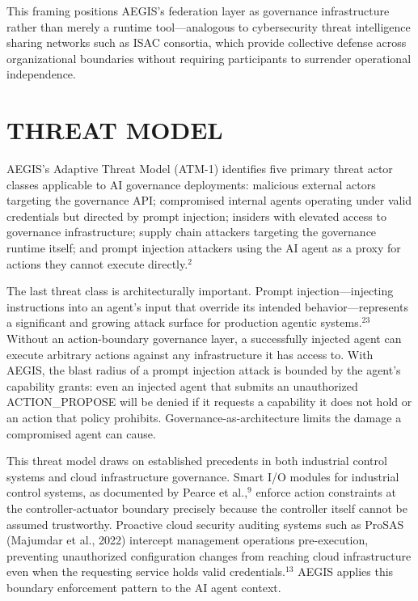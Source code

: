 \documentclass{IEEEcsmag}
\begin{document}
This framing positions AEGIS's federation layer as governance infrastructure rather than merely a runtime tool---analogous to cybersecurity threat intelligence sharing networks such as ISAC consortia, which provide collective defense across organizational boundaries without requiring participants to surrender operational independence.

\section{THREAT MODEL}

AEGIS's Adaptive Threat Model (ATM-1) identifies five primary threat actor classes applicable to AI governance deployments: malicious external actors targeting the governance API; compromised internal agents operating under valid credentials but directed by prompt injection; insiders with elevated access to governance infrastructure; supply chain attackers targeting the governance runtime itself; and prompt injection attackers using the AI agent as a proxy for actions they cannot execute directly.$^{2}$

The last threat class is architecturally important. Prompt injection---injecting instructions into an agent's input that override its intended behavior---represents a significant and growing attack surface for production agentic systems.$^{23}$ Without an action-boundary governance layer, a successfully injected agent can execute arbitrary actions against any infrastructure it has access to. With AEGIS, the blast radius of a prompt injection attack is bounded by the agent's capability grants: even an injected agent that submits an unauthorized ACTION\_PROPOSE will be denied if it requests a capability it does not hold or an action that policy prohibits. Governance-as-architecture limits the damage a compromised agent can cause.

This threat model draws on established precedents in both industrial control systems and cloud infrastructure governance. Smart I/O modules for industrial control systems, as documented by Pearce et al.,$^{9}$ enforce action constraints at the controller-actuator boundary precisely because the controller itself cannot be assumed trustworthy. Proactive cloud security auditing systems such as ProSAS (Majumdar et al., 2022) intercept management operations pre-execution, preventing unauthorized configuration changes from reaching cloud infrastructure even when the requesting service holds valid credentials.$^{13}$ AEGIS applies this boundary enforcement pattern to the AI agent context.
\end{document}
